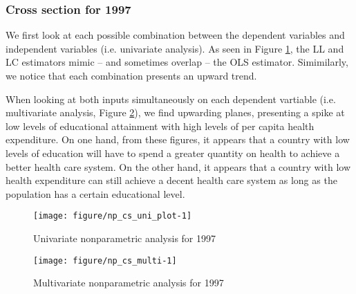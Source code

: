 \documentclass[12pt,a4paper]{article}\usepackage[]{graphicx}\usepackage[]{color}
\newenvironment{knitrout}{}{} %
\begin{document}
 
\subsubsection{Cross section for 1997}
 
We first look at each possible combination between the dependent variables and independent variables (i.e. univariate analysis). As seen in Figure \ref{fig:np.cs.uni.plot}, the LL and LC estimators mimic -- and sometimes overlap -- the OLS estimator. Simimilarly, we notice that each combination presents an upward trend.
 
When looking at both inputs simultaneously on each dependent vartiable (i.e. multivariate analysis, Figure \ref{fig:np.cs.multi}), we find upwarding planes, presenting a spike at low levels of educational attainment with high levels of per capita health expenditure. On one hand, from these figures, it appears that a country with low levels of education will have to spend a greater quantity on health to achieve a better health care system. On the other hand, it appears that a country with low health expenditure can still achieve a decent health care system as long as the population has a certain educational level.



\begin{knitrout}
\color{fgcolor}\begin{figure}[htbp]

{\centering \texttt{[image: figure/np\_cs\_uni\_plot-1]} 

}

\caption[Univariate nonparametric analysis for 1997]{Univariate nonparametric analysis for 1997}\label{fig:np.cs.uni.plot}
\end{figure}


\end{knitrout}

\begin{knitrout}
\color{fgcolor}\begin{figure}[htbp]

{\centering \texttt{[image: figure/np\_cs\_multi-1]} 

}

\caption[Multivariate nonparametric analysis for 1997]{Multivariate nonparametric analysis for 1997}\label{fig:np.cs.multi}
\end{figure}


\end{knitrout}
\end{document}
